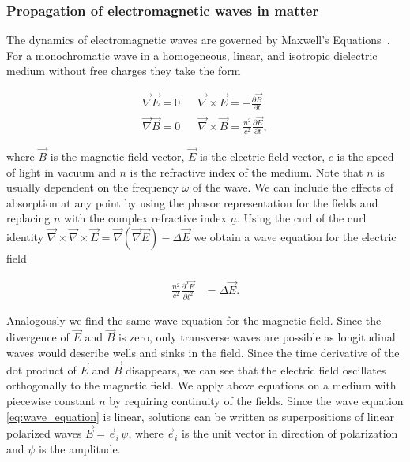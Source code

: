 \subsubsection{Propagation of electromagnetic waves in matter}

The dynamics of electromagnetic waves are governed by Maxwell's Equations~\cite{PriciplesOfOptics}. For a monochromatic wave in a homogeneous, linear, and isotropic dielectric medium without free charges they take the form

\begin{eqnarray*}
\vec \nabla \vec E = 0 && \vec \nabla \times \vec E = - \frac{ \partial \vec B }{ \partial t }  \\
\vec \nabla \vec B = 0 && \vec \nabla \times \vec B = \frac{n^2}{c^2} \frac{ \partial \vec E }{ \partial t },
\end{eqnarray*}

where $\vec B$ is the magnetic field vector, $\vec E$ is the electric field vector, $c$ is the speed of light in vacuum and $n$ is the refractive index of the medium. Note that $n$ is usually dependent on the frequency $\omega$ of the wave. We can include the effects of absorption at any point by using the phasor representation for the fields and replacing $n$ with the complex refractive index $\underline n$. Using the curl of the curl identity $\vec \nabla \times \vec \nabla \times \vec E = \vec \nabla (\vec \nabla  \vec E ) - \Delta  \vec E$ we obtain a wave equation for the electric field

\begin{align} \label{eq:wave_equation} 
\frac{n^2}{c^2} \frac{ \partial^2 \vec E }{ \partial t^2 } & = \Delta \vec E.
\end{align}

Analogously we find the same wave equation for the magnetic field. Since the divergence of $\vec E$ and $\vec B$ is zero, only transverse waves are possible as longitudinal waves would describe wells and sinks in the field. Since the time derivative of the dot product of $\vec E$ and $\vec B$ disappears, we can see that the electric field oscillates orthogonally to the magnetic field. We apply above equations on a medium with piecewise constant $n$ by requiring continuity of the fields. Since the wave equation \eqref{eq:wave_equation} is linear, solutions can be written as superpositions of linear polarized waves $\vec E = \vec{e}_i \, \psi $, where $\vec{e}_i$ is the unit vector in direction of polarization and $\psi$ is the amplitude.

